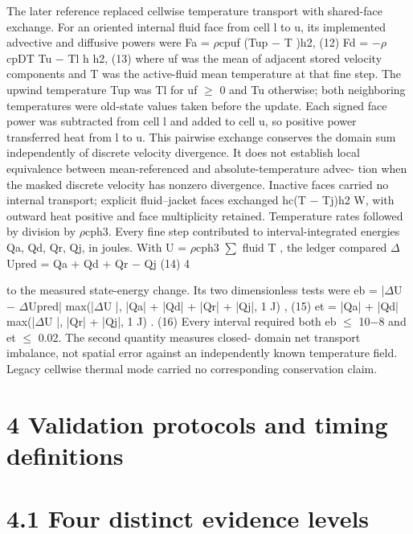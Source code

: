 \documentclass[11pt]{article}
\begin{document}
The later reference replaced cellwise temperature transport with shared-face exchange. For an
oriented internal fluid face from cell l to u, its implemented advective and diffusive powers were
Fa = \ensuremath{\rho}cpuf (Tup \ensuremath{-} T )h2, (12)
Fd = \ensuremath{-}\ensuremath{\rho}cpDT
Tu \ensuremath{-} Tl
h h2, (13)
where uf was the mean of adjacent stored velocity components and T was the active-fluid mean
temperature at that fine step. The upwind temperature Tup was Tl for uf \ensuremath{\geq} 0 and Tu otherwise;
both neighboring temperatures were old-state values taken before the update. Each signed face
power was subtracted from cell l and added to cell u, so positive power transferred heat from l to
u. This pairwise exchange conserves the domain sum independently of discrete velocity divergence.
It does not establish local equivalence between mean-referenced and absolute-temperature advec-
tion when the masked discrete velocity has nonzero divergence. Inactive faces carried no internal
transport; explicit fluid–jacket faces exchanged hc(T \ensuremath{-} Tj)h2 W, with outward heat positive and
face multiplicity retained. Temperature rates followed by division by \ensuremath{\rho}cph3.
Every fine step contributed to interval-integrated energies Qa, Qd, Qr, Qj, in joules. With U =
\ensuremath{\rho}cph3 \ensuremath{\sum}
fluid T , the ledger compared
\ensuremath{\Delta}Upred = Qa + Qd + Qr \ensuremath{-} Qj (14)
4

to the measured state-energy change. Its two dimensionless tests were
eb = |\ensuremath{\Delta}U \ensuremath{-} \ensuremath{\Delta}Upred|
max(|\ensuremath{\Delta}U |, |Qa| + |Qd| + |Qr| + |Qj|, 1 J) , (15)
et = |Qa| + |Qd|
max(|\ensuremath{\Delta}U |, |Qr| + |Qj|, 1 J) . (16)
Every interval required both eb \ensuremath{\leq} 10\ensuremath{-}8 and et \ensuremath{\leq} 0.02. The second quantity measures closed-
domain net transport imbalance, not spatial error against an independently known temperature
field. Legacy cellwise thermal mode carried no corresponding conservation claim.

\section*{4 Validation protocols and timing definitions}


\section*{4.1 Four distinct evidence levels}
\end{document}
